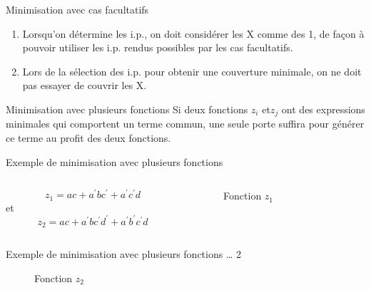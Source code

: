 \documentclass[presentation]{beamer}
\begin{document}
\begin{frame}[label={sec:orgdd3544c}]{Minimisation avec cas facultatifs}
\begin{enumerate}
\item Lorsqu'on détermine les i.p., on doit considérer les X comme des
1, de façon à pouvoir utiliser les i.p. rendus possibles par les
cas facultatifs.

\item Lors de la sélection des i.p. pour obtenir une couverture
minimale, on ne doit pas essayer de couvrir les X.
\end{enumerate}
\end{frame}

\begin{frame}[label={sec:org8fa8a11}]{Minimisation avec plusieurs fonctions}
Si deux fonctions \(z_i\) et\(z_j\) ont des expressions minimales qui comportent un terme commun, une seule porte suffira pour générer ce terme au profit des deux fonctions.
\end{frame}

\begin{frame}[label={sec:orgd90aa33}]{Exemple de minimisation avec plusieurs fonctions}
\begin{columns}
\begin{column}{0.48\columnwidth}
\begin{block}{}
$$z_1 = a c + a^{\prime} b c^{\prime} + a^{\prime} c^{\prime} d$$ et 
$$z_2 = a c + a^{\prime}  b c^{\prime} d^{\prime} +
a^{\prime} b^{\prime} c^{\prime} d$$
\end{block}
\end{column}

\begin{column}{0.48\columnwidth}
\begin{block}{}
\begin{figure}[htbp]
\centering

\caption{\label{fig:org04ada6f}Fonction \(z_1\)}
\end{figure}
\end{block}
\end{column}
\end{columns}
\end{frame}

\begin{frame}[label={sec:orgdd13f17}]{Exemple de minimisation avec plusieurs fonctions \ldots{} 2}
\begin{figure}[htbp]
\centering

\caption{\label{fig:org572d15e}Fonction \(z_2\)}
\end{figure}
\end{frame}
\end{document}
